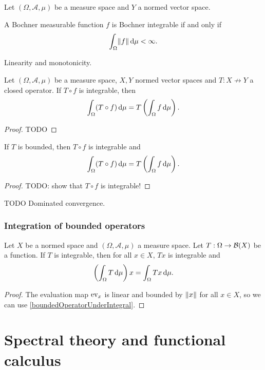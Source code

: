 \begin{proposition} \label{BochnerIntegrabilityCondition}
Let $(\Omega, \mathcal{A},\mu)$ be a measure space and $Y$ a normed vector space.

A Bochner measurable function $f$ is Bochner integrable \textup{if and only if}
\[ \int_\Omega \lVert f\rVert \operatorname{d \!}{\mu} < \infty. \]
\end{proposition}

\begin{proposition}
Linearity and monotonicity.
\end{proposition}

\begin{theorem} \label{HilleTheorem}
Let $(\Omega, \mathcal{A},\mu)$ be a measure space, $X,Y$ normed vector spaces and $T: X\not\to Y$ a closed operator. If $T\circ f$ is integrable, then
\[ \int_\Omega (T\circ f)\operatorname{d \!}{\mu} = T\left(\int_\Omega f\operatorname{d \!}{\mu}\right). \]
\end{theorem}
\begin{proof}
TODO
\end{proof}
\begin{corollary} \label{boundedOperatorUnderIntegral}
If $T$ is bounded, then $T\circ f$ is integrable and
\[ \int_\Omega (T\circ f)\operatorname{d \!}{\mu} = T\left(\int_\Omega f\operatorname{d \!}{\mu}\right). \]
\end{corollary}
\begin{proof}
TODO: show that $T\circ f$ is integrable!
\end{proof}

TODO Dominated convergence.

\subsection{Integration of bounded operators}
\begin{lemma} \label{integralBoundedOperator}
Let $X$ be a normed space and $(\Omega, \mathcal{A},\mu)$ a measure space. Let $T: \Omega \to \operatorname{\mathcal{B}}(X)$ be a function. If $T$ is integrable, then for all $x\in X$, $Tx$ is integrable and
\[ \left(\int_\Omega T\operatorname{d \!}{\mu}\right)x = \int_\Omega Tx\operatorname{d \!}{\mu}. \]
\end{lemma}
\begin{proof}
The evaluation map $\operatorname{ev}_x$ is linear and bounded by $\lVert x\rVert$ for all $x\in X$, so we can use \ref{boundedOperatorUnderIntegral}.
\end{proof}


\chapter{Spectral theory and functional calculus}
